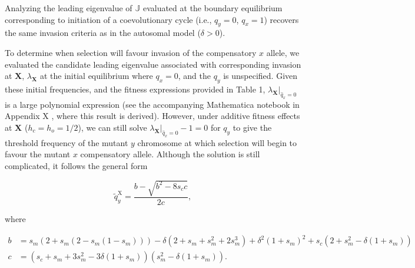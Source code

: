 \documentclass{article}
\newcommand\hl[1]{%
  \bgroup
  \hskip0pt\color{blue!80!black}%
  #1%
  \egroup
}
\begin{document}
\noindent Analyzing the leading eigenvalue of $\mathbb{J}$ evaluated at the boundary equilibrium corresponding to initiation of a coevolutionary cycle (i.e., $q_y = 0$, $q_x = 1$) recovers the same invasion criteria as in the autosomal model ($\delta > 0$).

To determine when selection will favour invasion of the compensatory $x$ allele, we evaluated the candidate leading eigenvalue associated with corresponding invasion at $\mathbf{X}$, $\lambda_{\mathbf{X}}$ at the initial equilibrium where $q_x = 0$, and the $q_y$ is unspecified. Given these initial frequencies, and the fitness expressions provided in Table 1, $\lambda_{\mathbf{X}}|_{\hat{q}_x = 0}$ is a large polynomial expression (see the accompanying Mathematica notebook in Appendix \hl{X}, where this result is derived). However, under additive fitness effects at $\mathbf{X}$ ($h_c = h_o = 1/2$), we can still solve $\lambda_{\mathbf{X}}|_{\hat{q}_x = 0} - 1 = 0$ for $q_y$ to give the threshold frequency of the mutant $y$ chromosome at which selection will begin to favour the mutant $x$ compensatory allele. Although the solution is still complicated, it follows the general form

\begin{equation} \label{eq:xInvDelta-threshold}
	\tilde{q}_y^{\text{X}} = \frac{b - \sqrt{b^2 - 8 s_c c}} {2 c},
\end{equation}

\noindent where 

\begin{subequations}
	\begin{align}
		b &= s_m (2 + s_m (2 - s_m(1 - s_m))) - \delta (2 + s_m + s_m^2 + 2 s_m^3) + \delta^2(1 + s_m)^2 + s_c (2 + s_m^2 - \delta(1 + s_m)) \\
		c &= (s_c + s_m + 3 s_m^2 - 3 \delta(1 + s_m)) (s_m^2 - \delta(1 + s_m)).
	\end{align}
\end{subequations}

\noindent 

%
\end{document}
